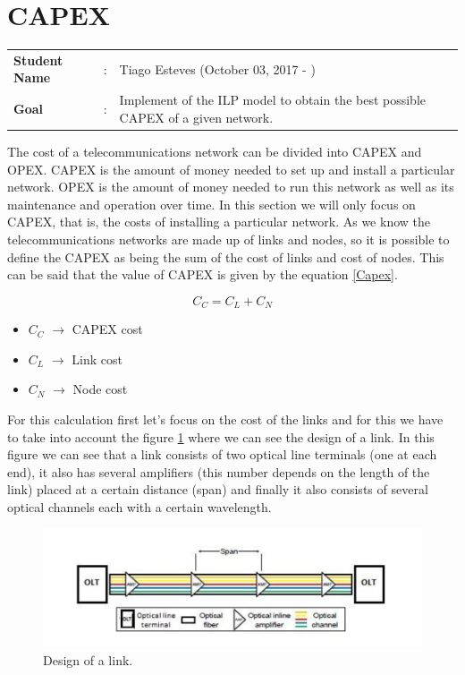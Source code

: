 \clearpage

\section{CAPEX}
\begin{tcolorbox}	
\begin{tabular}{p{2.75cm} p{0.2cm} p{10.5cm}} 	
\textbf{Student Name}  &:& Tiago Esteves    (October 03, 2017 - )\\
\textbf{Goal}          &:& Implement of the ILP model to obtain the best possible CAPEX of a given network.
\end{tabular}
\end{tcolorbox}
\vspace{11pt}

The cost of a telecommunications network can be divided into CAPEX and OPEX.
CAPEX is the amount of money needed to set up and install a particular network.
OPEX is the amount of money needed to run this network as well as its maintenance and operation over time.
In this section we will only focus on CAPEX, that is, the costs of installing a particular network.
As we know the telecommunications networks are made up of links and nodes, so it is possible to define the CAPEX as being the sum of the cost of links and cost of nodes.
This can be said that the value of CAPEX is given by the equation \ref{Capex}.

\begin{equation}
C_C = C_L + C_N
\label{Capex}
\end{equation}


\begin{itemize}
\item{$C_C$				$\rightarrow$	CAPEX cost}
\item{$C_L$				$\rightarrow$	Link cost}
\item{$C_N$				$\rightarrow$	Node cost}
\end{itemize}


\vspace{11pt}
For this calculation first let's focus on the cost of the links and for this we have to take into account the figure \ref{link_design} where we can see the design of a link. In this figure we can see that a link consists of two optical line terminals (one at each end), it also has several amplifiers (this number depends on the length of the link) placed at a certain distance (span) and finally it also consists of several optical channels each with a certain wavelength.

\begin{figure}[h!]
\centering
\includegraphics[width=\textwidth]{sdf/ILP/figures/link_design}
\caption{Design of a link.}
\label{link_design}
\end{figure}

